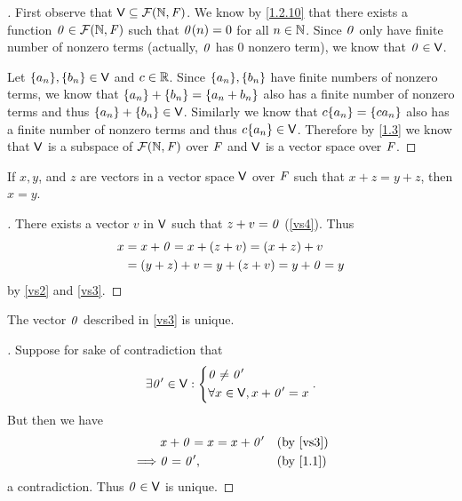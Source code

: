 \begin{proof}[]
	First observe that \(\mathsf{V} \subseteq \mathcal{F}(\mathbb{N}, \mathit{F})\).
	We know by \cref{1.2.10} that there exists a function \(\mathit{0} \in \mathcal{F}(\mathbb{N}, \mathit{F})\) such that \(\mathit{0}(n) = 0\) for all \(n \in \mathbb{N}\).
	Since \(\mathit{0}\) only have finite number of nonzero terms (actually, \(\mathit{0}\) has \(0\) nonzero term), we know that \(\mathit{0} \in \mathsf{V}\).

	Let \(\B{a_n}, \B{b_n} \in \V\) and \(c \in \mathbb{R}\).
	Since \(\B{a_n}, \B{b_n}\) have finite numbers of nonzero terms, we know that \(\left\lbrace a_n\right\rbrace + \left\lbrace b_n\right\rbrace = \left\lbrace a_n + b_n\right\rbrace\) also has a finite number of nonzero terms and thus \(\left\lbrace a_n\right\rbrace + \left\lbrace b_n\right\rbrace \in \mathsf{V}\).
	Similarly we know that \(c\B{a_n} = \B{ca_n}\) also has a finite number of nonzero terms and thus \(c\B{a_n} \in \V\).
	Therefore by \cref{1.3} we know that \(\mathsf{V}\) is a subspace of \(\mathcal{F}(\mathbb{N}, \mathit{F})\) over \(\mathit{F}\) and \(\mathsf{V}\) is a vector space over \(\mathit{F}\).
\end{proof}

\begin{thm}\label{1.1}
	If \(x, y\), and \(z\) are vectors in a vector space \(\mathsf{V}\) over \(\mathit{F}\) such that \(x + z = y + z\), then \(x = y\).
\end{thm}

\begin{proof}[]
	There exists a vector \(v\) in \(\mathsf{V}\) such that \(z + v = \mathit{0}\) (\ref{vs4}).
	Thus
	\begin{align*}
		x & = x + \mathit{0} = x + (z + v) = (x + z) + v     \\
		  & = (y + z) + v = y + (z + v) = y + \mathit{0} = y
	\end{align*}
	by \ref{vs2} and \ref{vs3}.
\end{proof}

\begin{cor}\label{1.2.14}
	The vector \(\mathit{0}\) described in \ref{vs3} is unique.
\end{cor}

\begin{proof}[]
	Suppose for sake of contradiction that
	\[
		\exists \mathit{0}' \in \mathsf{V} : \begin{dcases}
			\mathit{0} \neq \mathit{0}' \\
			\forall x \in \mathsf{V}, x + \mathit{0}' = x
		\end{dcases}.
	\]
	But then we have
	\begin{align*}
		         & x + \zv = x = x + \zv' &  & \text{(by \ref{vs3})}  \\
		\implies & \zv = \zv',            &  & \text{(by \cref{1.1})}
	\end{align*}
	a contradiction.
	Thus \(\mathit{0} \in \mathsf{V}\) is unique.
\end{proof}

